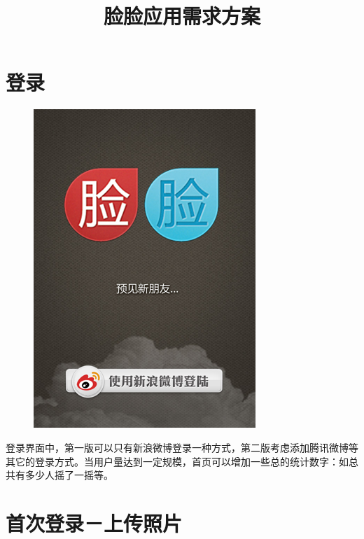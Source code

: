 \documentclass[cs4size]{ctexartutf8}
\title{脸脸应用需求方案}
\begin{document}
 

\maketitle



\section{登录}

\begin{figure}[H]
\centering
\includegraphics[scale=0.5]{./1.png}
\label{p1}
\end{figure}

登录界面中，第一版可以只有新浪微博登录一种方式，第二版考虑添加腾讯微博等其它的登录方式。当用户量达到一定规模，首页可以增加一些总的统计数字：如总共有多少人摇了一摇等。

\section{首次登录－上传照片}
\end{document}
